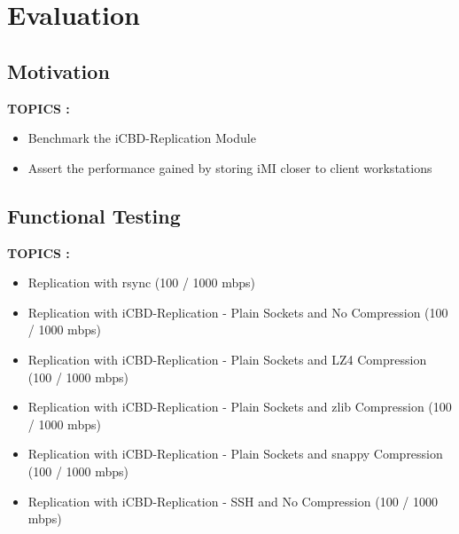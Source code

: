 \chapter{Evaluation}
\label{cha:evaluation}

\section{Motivation}
\label{sec:motivation}

\textbf{TOPICS :}
\begin{itemize}
	\item Benchmark the iCBD-Replication Module
	\item Assert the performance gained by storing iMI closer to client workstations
\end{itemize}



\section{Functional Testing}
\label{sec:rep_functional_testing}

\textbf{TOPICS :}
\begin{itemize}
	\item Replication with rsync (100 / 1000 mbps)
	\item Replication with iCBD-Replication - Plain Sockets and No Compression (100 / 1000 mbps)
	\item Replication with iCBD-Replication - Plain Sockets and LZ4 Compression (100 / 1000 mbps)
	\item Replication with iCBD-Replication - Plain Sockets and zlib Compression (100 / 1000 mbps)
	\item Replication with iCBD-Replication - Plain Sockets and snappy Compression (100 / 1000 mbps)
	\item Replication with iCBD-Replication - SSH and No Compression (100 / 1000 mbps)
\end{itemize}

